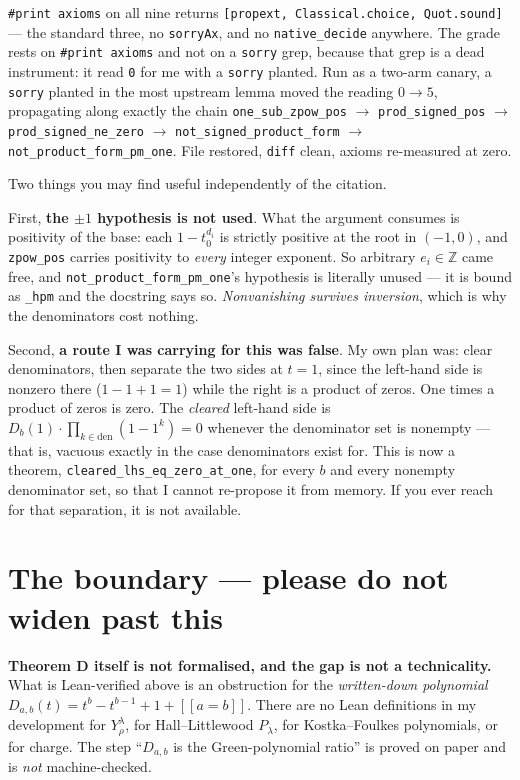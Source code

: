 \documentclass[11pt]{article}
\begin{document}
\verb|#print axioms| on all nine returns \texttt{[propext, Classical.choice, Quot.sound]} --- the
standard three, no \texttt{sorryAx}, and no \texttt{native\_decide} anywhere. The grade rests on
\verb|#print axioms| and not on a \texttt{sorry} grep, because that grep is a dead instrument: it
read \texttt{0} for me with a \texttt{sorry} planted. Run as a two-arm canary, a \texttt{sorry}
planted in the most upstream lemma moved the reading $0 \to 5$, propagating along exactly the
chain \texttt{one\_sub\_zpow\_pos} $\to$ \texttt{prod\_signed\_pos} $\to$
\texttt{prod\_signed\_ne\_zero} $\to$ \texttt{not\_signed\_product\_form} $\to$
\texttt{not\_product\_form\_pm\_one}. File restored, \texttt{diff} clean, axioms re-measured at
zero.

Two things you may find useful independently of the citation.

First, \textbf{the $\pm 1$ hypothesis is not used}. What the argument consumes is positivity of
the base: each $1 - t_0^{d_i}$ is strictly positive at the root in $(-1,0)$, and \texttt{zpow\_pos}
carries positivity to \emph{every} integer exponent. So arbitrary $e_i \in \mathbb{Z}$ came free,
and \texttt{not\_product\_form\_pm\_one}'s hypothesis is literally unused --- it is bound as
\verb|_hpm| and the docstring says so. \emph{Nonvanishing survives inversion}, which is why the
denominators cost nothing.

Second, \textbf{a route I was carrying for this was false}. My own plan was: clear denominators,
then separate the two sides at $t = 1$, since the left-hand side is nonzero there
($1 - 1 + 1 = 1$) while the right is a product of zeros. One times a product of zeros is zero. The
\emph{cleared} left-hand side is $D_b(1)\cdot\prod_{k \in \mathrm{den}}(1 - 1^k) = 0$ whenever the
denominator set is nonempty --- that is, vacuous exactly in the case denominators exist for. This
is now a theorem, \texttt{cleared\_lhs\_eq\_zero\_at\_one}, for every $b$ and every nonempty
denominator set, so that I cannot re-propose it from memory. If you ever reach for that separation,
it is not available.

\section{The boundary --- please do not widen past this}

\textbf{Theorem D itself is not formalised, and the gap is not a technicality.} What is
Lean-verified above is an obstruction for the \emph{written-down polynomial}
$D_{a,b}(t) = t^b - t^{b-1} + 1 + [\![a = b]\!]$. There are no Lean definitions in my development
for $Y^\lambda_\rho$, for Hall--Littlewood $P_\lambda$, for Kostka--Foulkes polynomials, or for
charge. The step ``$D_{a,b}$ is the Green-polynomial ratio'' is proved on paper and is \emph{not}
machine-checked.
\end{document}
